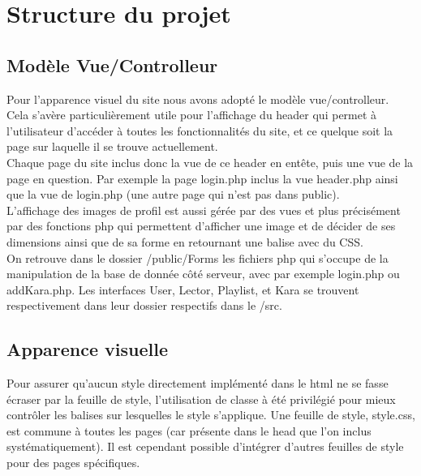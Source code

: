 \section{Structure du projet}
\subsection{Modèle Vue/Controlleur}
Pour l'apparence visuel du site nous avons adopté le modèle vue/controlleur. \\
Cela s'avère particulièrement utile pour l'affichage du header qui permet à l'utilisateur d'accéder à toutes les fonctionnalités du site, et ce quelque soit la page sur laquelle il se trouve actuellement.\\
Chaque page du site inclus donc la vue de ce header en entête, puis une vue de la page en question.
Par exemple la page login.php inclus la vue header.php ainsi que la vue de login.php (une autre page qui n'est pas dans public).\\
L'affichage des images de profil est aussi gérée par des vues et plus précisément par des fonctions php qui permettent d'afficher une image et de décider de ses dimensions ainsi que de sa forme en retournant une balise avec du CSS.\\
On retrouve dans le dossier /public/Forms les fichiers php qui s'occupe de la manipulation de la base de donnée côté serveur, avec par exemple login.php ou addKara.php.\newline
Les interfaces User, Lector, Playlist, et Kara se trouvent respectivement dans leur dossier respectifs dans le /src.


\subsection{Apparence visuelle}
Pour assurer qu'aucun style directement implémenté dans le html ne se fasse écraser par la feuille de style, l'utilisation de classe à été privilégié pour mieux contrôler les balises sur lesquelles le style s'applique. Une feuille de style, style.css, est commune à toutes les pages (car présente dans le head que l'on inclus systématiquement). Il est cependant possible d'intégrer d'autres feuilles de style pour des pages spécifiques.

